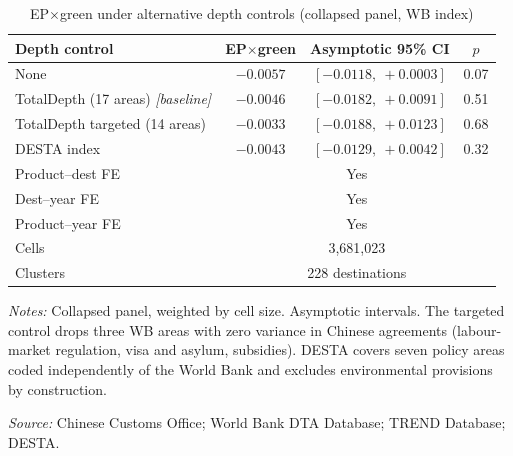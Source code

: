 \begin{table}[htbp]
\centering
\caption{EP$\times$green under alternative depth controls (collapsed panel, WB index)}
\label{tab:depthbounds}
\small
\begin{threeparttable}
\begin{tabular}{lccc}
\toprule
Depth control & EP$\times$green & Asymptotic 95\% CI & $p$ \\
\midrule
None & $-0.0057$ & $[-0.0118,\ +0.0003]$ & 0.07 \\
TotalDepth (17 areas) \hfill\textit{[baseline]} & $-0.0046$ & $[-0.0182,\ +0.0091]$ & 0.51 \\
TotalDepth targeted (14 areas) & $-0.0033$ & $[-0.0188,\ +0.0123]$ & 0.68 \\
DESTA index & $-0.0043$ & $[-0.0129,\ +0.0042]$ & 0.32 \\
\midrule
Product--dest FE & \multicolumn{3}{c}{Yes} \\
Dest--year FE & \multicolumn{3}{c}{Yes} \\
Product--year FE & \multicolumn{3}{c}{Yes} \\
Cells & \multicolumn{3}{c}{3,681,023} \\
Clusters & \multicolumn{3}{c}{228 destinations} \\
\bottomrule
\end{tabular}
\begin{tablenotes}[flushleft]\footnotesize
\item \emph{Notes:} Collapsed panel, weighted by cell size. Asymptotic intervals. The targeted control drops three WB areas with zero variance in Chinese agreements (labour-market regulation, visa and asylum, subsidies). DESTA covers seven policy areas coded independently of the World Bank and excludes environmental provisions by construction.
\item \textit{Source:} Chinese Customs Office; World Bank DTA Database; TREND Database; DESTA.
\end{tablenotes}
\end{threeparttable}

\end{table}
